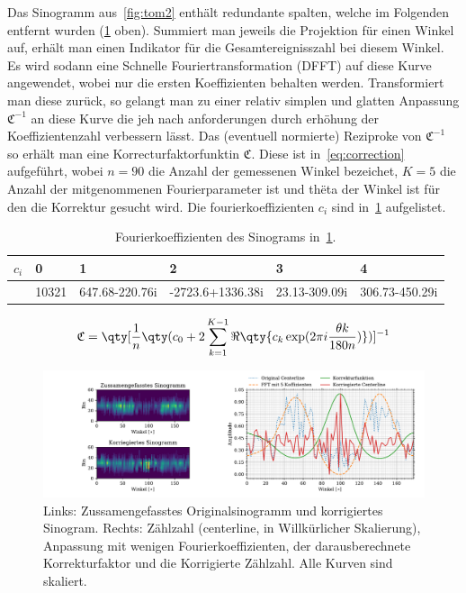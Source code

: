 \documentclass[slug=PET, room=Andreas-Schubert-Bau\,\ 424A, supervisor=Carsten\ Bittrich, coursedate=10.\ 01.\ 2020]{../../Lab_Report_LaTeX/lab_report}
\begin{document}
Das Sinogramm aus~\ref{fig:tom2} enth\"alt redundante spalten, welche
im Folgenden entfernt wurden (\ref{fig:tom2-raw_and_corrected}
oben). Summiert man jeweils die Projektion f\"ur einen Winkel auf,
erh\"alt man einen Indikator f\"ur die Gesamtereignisszahl bei diesem
Winkel. Es wird sodann eine Schnelle Fouriertransformation (DFFT) auf
diese Kurve angewendet, wobei nur die ersten Koeffizienten behalten
werden.  Transformiert man diese zur\"uck, so gelangt man zu einer
relativ simplen und glatten Anpassung \(\mathfrak{C}^{-1}\) an diese
Kurve die jeh nach anforderungen durch erh\"ohung der
Koeffizientenzahl verbessern l\"asst. Das (eventuell normierte)
Reziproke von \(\mathfrak{C}^{-1}\) so erh\"alt man eine
Korrecturfaktorfunktin \(\mathfrak{C}\). Diese ist
in~\eqref{eq:correction} aufgef\"uhrt, wobei \(n=90\) die Anzahl der
gemessenen Winkel bezeichet, \(K=5\) die Anzahl der mitgenommenen
Fourierparameter ist und th\"eta der Winkel ist f\"ur den die
Korrektur gesucht wird. Die fourierkoeffizienten \(c_i\) sind
in~\ref{tab:coeff} aufgelistet.

\begin{table}[h]
  \centering
  \begin{tabular}{l|lllll}
    \toprule
    \(c_i\) & 0 & 1 & 2 & 3 & 4 \\
    \midrule
            & 10321 & 647.68-220.76i & -2723.6+1336.38i & 23.13-309.09i & 306.73-450.29i
  \end{tabular}
  \caption{Fourierkoeffizienten des Sinograms in~\ref{fig:tom2-raw_and_corrected}.}
  \label{tab:coeff}
\end{table}

\begin{equation}
  \label{eq:correction}
  \mathfrak{C} = \qty[\frac{1}{n}
  \qty(c_0 + 2\sum_{k=1}^{K-1}{\Re\qty{c_k\exp(2\pi i \frac{\theta k}{180 n})}})]^{-1}
\end{equation}

\begin{figure}[h]
  \centering
  \includegraphics[width=\textwidth]{../auswertung/figs/tom2/raw_and_corrected.pdf}
  \caption[Sinogramme und Korrekturfunktion]{Links: Zussamengefasstes
    Originalsinogramm und korrigiertes Sinogram. Rechts: Z\"ahlzahl
    (centerline, in Willk\"urlicher Skalierung), Anpassung mit wenigen
  Fourierkoeffizienten, der darausberechnete Korrekturfaktor und die
  Korrigierte Z\"ahlzahl. Alle Kurven sind skaliert.}
  \label{fig:tom2-raw_and_corrected}
\end{figure}
\end{document}
